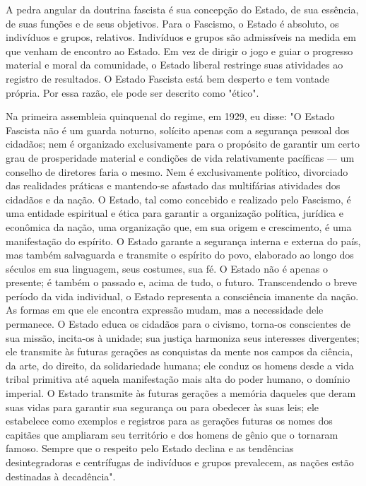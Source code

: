 \documentclass[12pt]{article}
\begin{document}
A pedra angular da doutrina fascista é sua concepção do Estado, de sua essência, de suas funções e de seus objetivos. Para o Fascismo, o Estado é absoluto, os indivíduos e grupos, relativos. Indivíduos e grupos são admissíveis na medida em que venham de encontro ao Estado. Em vez de dirigir o jogo e guiar o progresso material e moral da comunidade, o Estado liberal restringe suas atividades ao registro de resultados. O Estado Fascista está bem desperto e tem vontade própria. Por essa razão, ele pode ser descrito como "ético".

Na primeira assembleia quinquenal do regime, em 1929, eu disse: "O Estado Fascista não é um guarda noturno, solícito apenas com a segurança pessoal dos cidadãos; nem é organizado exclusivamente para o propósito de garantir um certo grau de prosperidade material e condições de vida relativamente pacíficas — um conselho de diretores faria o mesmo. Nem é exclusivamente político, divorciado das realidades práticas e mantendo-se afastado das multifárias atividades dos cidadãos e da nação. O Estado, tal como concebido e realizado pelo Fascismo, é uma entidade espiritual e ética para garantir a organização política, jurídica e econômica da nação, uma organização que, em sua origem e crescimento, é uma manifestação do espírito. O Estado garante a segurança interna e externa do país, mas também salvaguarda e transmite o espírito do povo, elaborado ao longo dos séculos em sua linguagem, seus costumes, sua fé. O Estado não é apenas o presente; é também o passado e, acima de tudo, o futuro. Transcendendo o breve período da vida individual, o Estado representa a consciência imanente da nação. As formas em que ele encontra expressão mudam, mas a necessidade dele permanece. O Estado educa os cidadãos para o civismo, torna-os conscientes de sua missão, incita-os à unidade; sua justiça harmoniza seus interesses divergentes; ele transmite às futuras gerações as conquistas da mente nos campos da ciência, da arte, do direito, da solidariedade humana; ele conduz os homens desde a vida tribal primitiva até aquela manifestação mais alta do poder humano, o domínio imperial. O Estado transmite às futuras gerações a memória daqueles que deram suas vidas para garantir sua segurança ou para obedecer às suas leis; ele estabelece como exemplos e registros para as gerações futuras os nomes dos capitães que ampliaram seu território e dos homens de gênio que o tornaram famoso. Sempre que o respeito pelo Estado declina e as tendências desintegradoras e centrífugas de indivíduos e grupos prevalecem, as nações estão destinadas à decadência".
\end{document}
